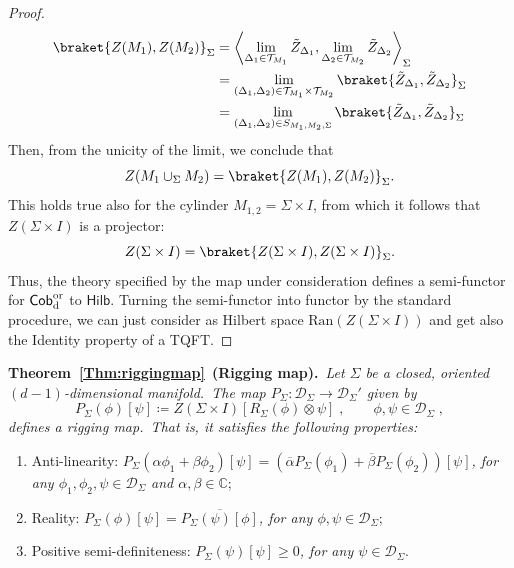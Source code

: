 \documentclass[11pt]{article}
\newcommand{\be}{\begin{equation}}
\newcommand{\ee}{\end{equation}}
\theoremstyle{definition}
\numberwithin{equation}{section}
\begin{document}
\begin{proof}
    \begin{align*}
\braket{Z(M_1),Z(M_2)}_{\Sigma}&=\left\langle\lim_{\Delta_1\in\mathcal{T}_{M_1}}\tilde{Z}_{\Delta_1},\lim_{\Delta_2\in\mathcal{T}_{M_2}}\tilde{Z}_{\Delta_2}\right\rangle_{\Sigma}\\
    &=\lim_{(\Delta_1,\Delta_2)\in\mathcal{T}_{M_1}\times\mathcal{T}_{M_2}}\braket{\tilde{Z}_{\Delta_1},\tilde{Z}_{\Delta_2}}_{\Sigma}\\
    &=\lim_{(\Delta_1,\Delta_2)\in S_{M_1,M_2,\Sigma}}\braket{\tilde{Z}_{\Delta_1},\tilde{Z}_{\Delta_2}}_{\Sigma}
\end{align*}
Then, from the unicity of the limit, we conclude that
\[Z(M_1\cup_{\Sigma}M_2)=\braket{Z(M_1),Z(M_2)}_{\Sigma}.\]
This holds true also for the cylinder $M_{1,2}=\Sigma\times I$, from which it follows that $Z(\Sigma\times I)$ is a projector: 
\[Z(\Sigma\times I)=\braket{Z(\Sigma\times I),Z(\Sigma\times I)}_{\Sigma}.\]
Thus, the theory specified by the map under consideration defines a semi-functor for $\mathsf{Cob}_{\rm d}^{\rm or}$ to $\mathsf{Hilb}$. Turning the semi-functor into functor by the standard procedure, we can just consider as Hilbert space $\mathrm{Ran}(Z(\Sigma\times I))$ and get also the Identity property of a TQFT.
\end{proof}

\noindent\textbf{Theorem~\ref{Thm:riggingmap}}~\textbf{(Rigging map).}~\emph{Let $\Sigma$ be a closed, oriented $(d-1)$-dimensional manifold.~The map $P_{\Sigma}:\mathcal D_{\Sigma}\to\mathcal D_{\Sigma}'$ given by}
\be\label{app:PSigma}
    P_{\Sigma}(\phi)[\psi]\coloneqq Z(\Sigma\times I)[R_{\Sigma}(\phi)\otimes\psi]\;,\qquad \phi,\psi\in\mathcal D_{\Sigma}\;,
\ee
\emph{defines a \emph{rigging map}.~That is, it satisfies the following properties:}
\begin{enumerate}
    \item[\emph{i.}] Anti-linearity: $P_{\Sigma}(\alpha\phi_1+\beta\phi_2)[\psi]=\left(\overline{\alpha}P_{\Sigma}(\phi_1)+\overline{\beta}P_{\Sigma}(\phi_2)\right)[\psi]$\emph{, for any $\phi_1,\phi_2,\psi\in\mathcal D_{\Sigma}$ and $\alpha,\beta\in\mathbb C$};
    \item[\emph{ii.}] Reality: $P_{\Sigma}(\phi)[\psi]=\overline{P_{\Sigma}(\psi)[\phi]}$\emph{, for any $\phi,\psi\in\mathcal D_{\Sigma}$};
    \item[\emph{iii.}]Positive semi-definiteness: $P_{\Sigma}(\psi)[\psi]\geq0$\emph{, for any $\psi\in\mathcal D_{\Sigma}$}.
\end{enumerate}
\end{document}
